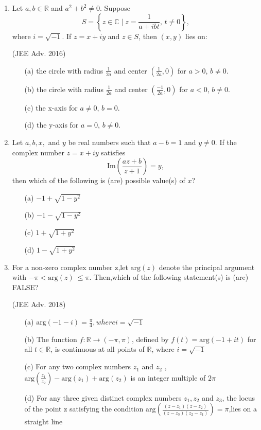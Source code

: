 \documentclass[journal,12pt,twocolumn]{IEEEtran}
\theoremstyle{remark}
\begin{document}
\begin{enumerate}
    \item Let \( a, b \in \mathbb{R} \) and \( a^2 + b^2 \ne 0 \). Suppose
    \[
    S = \left\{ z \in \mathbb{C} \mid z = \frac{1}{a + ibt}, \, t \ne 0 \right\},
    \]
    where \( i = \sqrt{-1} \). If \( z = x + iy \) and \( z \in S \), then \((x, y)\) lies on:

    \hfill (JEE Adv. 2016)

    \begin{itemize}
    \item[(a)] the circle with radius \( \frac{1}{2a} \) and center \(\left(\frac{1}{2a}, 0\right)\) for \( a > 0 \), \( b \ne 0 \).
    \item[(b)] the circle with radius \( \frac{1}{2a} \) and center \(\left(\frac{-1}{2a}, 0\right)\) for \( a < 0 \), \( b \ne 0 \).
    \item[(c)] the x-axis for \( a \ne 0 \), \( b = 0 \).
    \item[(d)] the y-axis for \( a = 0 \), \( b \ne 0 \).
    \end{itemize}

    \item Let \( a, b, x, \) and \( y \) be real numbers such that \( a - b = 1 \) and \( y \ne 0 \). If the complex number \( z = x + iy \) satisfies 
\[
\text{Im}\left(\frac{az + b}{z + 1}\right) = y,
\]
then which of the following is (are) possible value(s) of \( x \)?

\begin{itemize}
    \item[(a)] \(-1+\sqrt{1-y^2}\)
    \item[(b)] \(-1-\sqrt{1-y^2}\)
    \item[(c)] \(1+\sqrt{1+y^2}\)
    \item[(d)] \(1-\sqrt{1+y^2}\)
    \end{itemize}

    \item For a non-zero complex number z,let \(\text{arg}(z)\) denote the principal argument with \( -\pi < \text{arg}(z)\ \leq \pi\). Then,which of the following statement(s) is (are) FALSE? 
    
    \hfill (JEE Adv. 2018)

    \begin{itemize}
    \item[(a)] \(\text{arg}(-1-i)= \frac{\pi}{4},where i= \sqrt{-1}\)
    \item[(b)] The function \(f: \mathbb{R} \to \left(-\pi, \pi\right) \), defined by \(f(t)=\text{arg}(-1+it)\) for all \( t \in \mathbb{R} \), is continuous at all points of \(\mathbb{R}\), where \(i= \sqrt{-1}\)
    \item[(c)] For any two complex numbers \(z_1\) and \(z_2\) , \( \text{arg}(\frac{z_1}{z_2})-\text{arg}(z_1)+\text{arg}(z_2)\) is an integer multiple of \(2\pi\)
    \item[(d)] For any three given distinct complex numbers \(z_1,z_2\) and \(z_3\), the locus of the point z satisfying the condition \( \text{arg}\left( \frac{(z-z_1)(z-z_2)}{(z-z_3)(z_2-z_1)}\right) =\pi\),lies on a straight line
    \end{itemize}


\end{enumerate}
\end{document}

